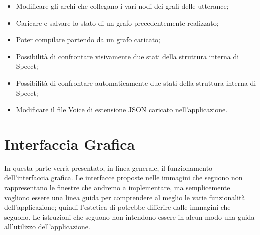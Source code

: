 \documentclass[../AnalisideiRequisiti.tex]{subfiles}
\begin{document}
\begin{itemize}
\begin{itemize}
		\item{}	Modificare gli archi che collegano i vari nodi dei grafi delle utterance;
		\item{} Caricare e salvare lo stato di un grafo precedentemente realizzato;
		\item{} Poter compilare partendo da un grafo caricato;
		\item{}	Possibilità di confrontare visivamente due stati della struttura interna di Speect;
		\item{} Possibilità di confrontare automaticamente due stati della struttura interna di Speect;
		\item{} Modificare il file Voice di estensione JSON caricato nell'applicazione.
	\end{itemize}
	
\end{itemize}

\chapter{Interfaccia Grafica}
In questa parte verrà presentato, in linea generale, il funzionamento dell'interfaccia grafica. Le interfacce proposte nelle immagini che seguono non rappresentano le finestre che andremo a implementare, ma semplicemente vogliono essere una linea guida per comprendere al meglio le varie funzionalità dell'applicazione; quindi l'estetica di \textit{} potrebbe differire dalle immagini che seguono. Le istruzioni che seguono non intendono essere in alcun modo una guida all'utilizzo dell'applicazione.
\end{document}
